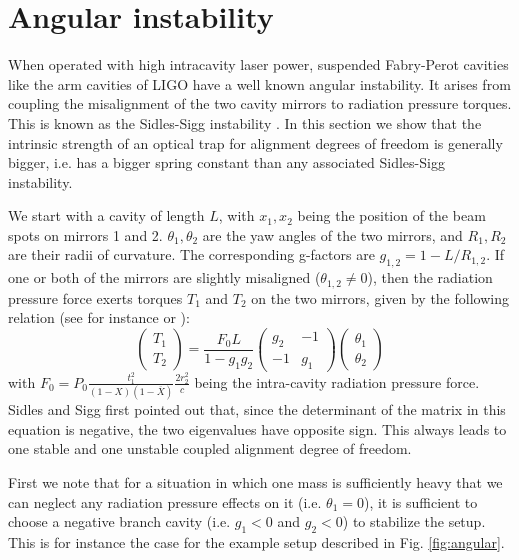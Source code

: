 
\section{Angular instability}
\label{sec:IV} 
When operated with high intracavity laser power, suspended Fabry-Perot
cavities like the arm cavities of LIGO have a well known angular instability.
It arises from coupling the misalignment of the two cavity mirrors to radiation
pressure torques.
This is known as the Sidles-Sigg instability
\cite{2006PhLA..354..167S}.
In this section we show that the intrinsic strength of an optical trap for
alignment degrees of freedom is generally bigger, i.e. has a bigger spring
constant than any associated Sidles-Sigg instability. 

We start with a cavity of length $L$, with $x_1,x_2$  being the position of the beam spots on mirrors 1 and 2. $\theta_1,\theta_2$ are the yaw angles of the two mirrors, and $R_1,R_2$ are their radii of curvature. The corresponding g-factors are $g_{1,2}=1-L/R_{1,2}$.
If one or both of the mirrors are slightly misaligned ($\theta_{1,2}\neq 0$), then the radiation pressure force exerts torques $T_1$ and $T_2$ on the two mirrors, given by the following relation (see for instance \cite{Sidles06} or \cite{Ballmer13}): 
\begin{equation}
\label{SidlesSigg_Basic}
\left(
\begin{array}{c}
T_1\\
T_2
\end{array}
\right)
=
\frac{F_0 L}{1-g_1 g_2}
\left(
\begin{array}{cc}
g_2 & -1\\
-1 & g_1
\end{array}
\right)
\left(
\begin{array}{c}
\theta_1\\
\theta_2
\end{array}
\right)
\end{equation} 
with $F_0=P_0\frac{t_1^2}{(1-X)(1-\overline{X})} \frac{2 r_2^2}{c}$ being the intra-cavity radiation pressure force. Sidles and Sigg first pointed out that, since the determinant of the matrix in this equation
 is negative, the two eigenvalues have opposite sign. This always leads to one stable and one unstable coupled alignment degree of freedom.

First we note that for a situation in which one mass is sufficiently heavy that we can neglect any radiation pressure effects on it (i.e. $\theta_1=0$), it is sufficient to choose a negative branch cavity (i.e. $g_1<0$ and $g_2<0$) to stabilize the setup. This is for instance the case for the example setup described in Fig. \ref{fig:angular}.

